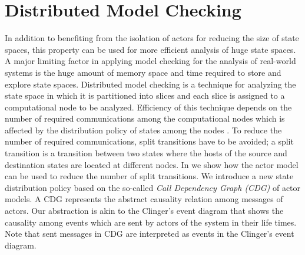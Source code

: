 \section{Distributed Model Checking} \label{sec::DMC}
In addition to benefiting from the isolation of actors for reducing the size of state spaces, this property can be used for more efficient analysis of huge state spaces. A major limiting factor in applying model checking for the analysis of real-world systems is the huge amount of memory space and time required to store and explore state spaces. Distributed model checking is a technique for analyzing the state space in which it is partitioned into slices and each slice is assigned to a computational node to be analyzed. Efficiency of this technique depends on the number of required communications among the computational nodes which is affected by the distribution policy of states among the nodes \cite{DBLP:journals/entcs/OrzanPE05}. 
%
To reduce the number of required communications, split transitions have to be avoided; a split transition is a transition between two states where the hosts of the source and destination states are located at different nodes. In \cite{DBLP:journals/eceasst/KhamespanahSMSR15} we show how the actor model can be used to reduce the number of split transitions. We introduce a new state distribution policy based on the so-called \textit{Call Dependency Graph (CDG)} of actor models. A CDG represents the abstract causality relation among messages of actors. Our abstraction is akin to the Clinger's event diagram \cite{clinger} that shows the causality among events which are sent by actors of the system in their life times. Note that sent messages in CDG are interpreted as events in the Clinger's event diagram.

